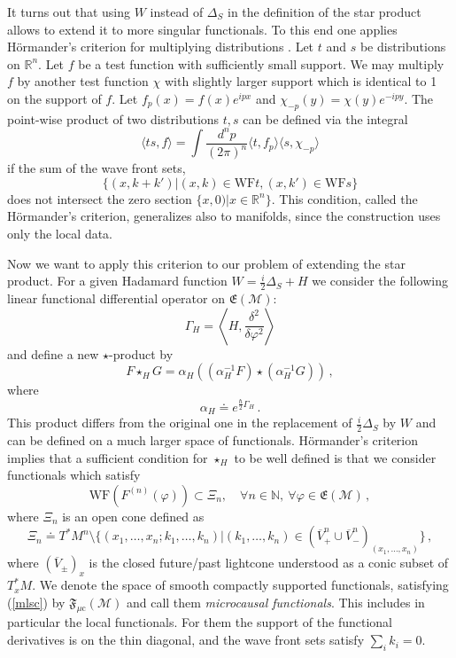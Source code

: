 \documentclass[12pt]{article}
\newcommand{\E}{\mathfrak{E}}
\newcommand{\F}{\mathfrak{F}}
\newcommand{\Mcal}{\mathcal{M}}
\newcommand{\WF}{\mathrm{WF}}         %
\newcommand{\mc}{{\mu\mathrm{c}}}
\newcommand{\NN}{\mathbb{N}}          %
\newcommand{\al}{\alpha}
\newcommand{\ph}{\varphi}
\newcommand{\1}{\mathds{1}}                         %
\newcommand{\be}{\begin{equation}}
\newcommand{\ee}{\end{equation}}
\begin{document}
{{It turns out that using $W$ instead of $\Delta_S$ in the definition of the star product allows to extend it to more singular functionals. To this end one applies H{\"o}rmander's criterion for multiplying distributions \cite{Hoer1}. Let $t$ and $s$ be distributions on $\mathbb R^n$. Let $f$ be a test function with sufficiently small support. We may multiply $f$ by another test function $\chi$ with slightly larger support which is identical to 1 on the support of $f$. Let $f_p(x)=f(x)e^{ipx}$ and $\chi_{-p}(y)=\chi(y)e^{-ipy}$.
The point-wise product of two distributions $t,s$ can be defined via the integral
\[\langle ts,f\rangle=\int \frac{d^np}{(2\pi)^n}\langle t,f_p\rangle\langle s,\chi_{-p}\rangle \] 
if the sum of the wave front sets,
{\[\{(x,k+k')|(x,k)\in\mathrm{WF}t,(x,k')\in\mathrm{WF}s\}\]}
{does not intersect the zero section $\{x,0)|x\in\mathbb R^n\}$.} This condition, called the  H{\"o}rmander's criterion, generalizes also to manifolds, since the construction uses only the local data.

Now we want to apply this criterion to our problem of extending the star product. For a given Hadamard function $W=\frac{i}{2}\Delta_S+H$ we consider the following linear functional differential operator on $\E(\Mcal)$:
\be
\Gamma_H=\left\langle H,\frac{\delta^2}{\delta\ph^2}\right\rangle
\ee
and define a new $\star$-product by
\be\label{Hprod}
F\star_HG=\al_H\left((\al^{-1}_HF)\star(\al_H^{-1}G)\right)\,, 
 \ee
 where 
 \[
 \al_H\doteq e^{\frac{\hbar}{2}\Gamma_H}\,.
 \]
 This product differs from the original one in the replacement of $\frac{i}{2}\Delta_S$ by $W$ and can be defined on a much larger space of functionals. H{\"o}rmander's criterion implies that a sufficient condition for $\star_H$ to be well defined is that we consider functionals which satisfy
 \be\label{mlsc}
\WF(F^{(n)}(\ph))\subset \Xi_n,\quad\forall n\in\NN,\ \forall\ph\in\E(\Mcal)\,,
\ee
where $\Xi_n$ is an open cone defined as 
\be\label{cone}
\Xi_n\doteq T^*M^n\setminus\{(x_1,\dots,x_n;k_1,\dots,k_n)| (k_1,\dots,k_n)\in (\overline{V}_+^n \cup \overline{V}_-^n)_{(x_1,\dots,x_n)}\}\,,
\ee
where $(\overline{V}_{\pm})_x$ is the closed future/past lightcone understood as a conic subset of
$T^*_xM$. We denote the space of smooth compactly supported functionals, satisfying (\ref{mlsc}) by $\F_\mc(\Mcal)$ and call them \textit{microcausal functionals}. This includes in particular the local functionals. For them the support of the functional derivatives is on the thin diagonal, and the wave front sets satisfy $\sum_i k_i=0$. 
 
}}
\end{document}
